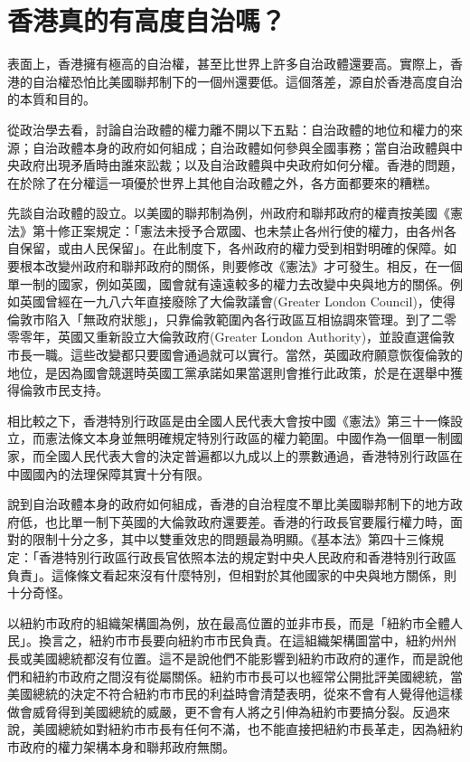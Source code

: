 \section{香港真的有高度自治嗎？}
\label{sec:sec16}

表面上，香港擁有極高的自治權，甚至比世界上許多自治政體還要高。實際上，香港的自治權恐怕比美國聯邦制下的一個州還要低。這個落差，源自於香港高度自治的本質和目的。

從政治學去看，討論自治政體的權力離不開以下五點：自治政體的地位和權力的來源；自治政體本身的政府如何組成；自治政體如何參與全國事務；當自治政體與中央政府出現矛盾時由誰來訟裁；以及自治政體與中央政府如何分權。香港的問題，在於除了在分權這一項優於世界上其他自治政體之外，各方面都要來的糟糕。

先談自治政體的設立。以美國的聯邦制為例，州政府和聯邦政府的權責按美國《憲法》第十修正案規定：「憲法未授予合眾國、也未禁止各州行使的權力，由各州各自保留，或由人民保留」。在此制度下，各州政府的權力受到相對明確的保障。如要根本改變州政府和聯邦政府的關係，則要修改《憲法》才可發生。相反，在一個單一制的國家，例如英國，國會就有遠遠較多的權力去改變中央與地方的關係。例如英國曾經在一九八六年直接廢除了大倫敦議會(Greater London Council)，使得倫敦市陷入「無政府狀態」，只靠倫敦範圍內各行政區互相協調來管理。到了二零零零年，英國又重新設立大倫敦政府(Greater London Authority)，並設直選倫敦市長一職。這些改變都只要國會通過就可以實行。當然，英國政府願意恢復倫敦的地位，是因為國會競選時英國工黨承諾如果當選則會推行此政策，於是在選舉中獲得倫敦市民支持。

相比較之下，香港特別行政區是由全國人民代表大會按中國《憲法》第三十一條設立，而憲法條文本身並無明確規定特別行政區的權力範圍。中國作為一個單一制國家，而全國人民代表大會的決定普遍都以九成以上的票數通過，香港特別行政區在中國國內的法理保障其實十分有限。

說到自治政體本身的政府如何組成，香港的自治程度不單比美國聯邦制下的地方政府低，也比單一制下英國的大倫敦政府還要差。香港的行政長官要履行權力時，面對的限制十分之多，其中以雙重效忠的問題最為明顯。《基本法》第四十三條規定：「香港特別行政區行政長官依照本法的規定對中央人民政府和香港特別行政區負責」。這條條文看起來沒有什麼特別，但相對於其他國家的中央與地方關係，則十分奇怪。

以紐約市政府的組織架構圖為例，放在最高位置的並非市長，而是「紐約市全體人民」。換言之，紐約市市長要向紐約市市民負責。在這組織架構圖當中，紐約州州長或美國總統都沒有位置。這不是說他們不能影響到紐約市政府的運作，而是說他們和紐約市政府之間沒有從屬關係。紐約市市長可以也經常公開批評美國總統，當美國總統的決定不符合紐約市市民的利益時會清楚表明，從來不會有人覺得他這樣做會威脅得到美國總統的威嚴，更不會有人將之引伸為紐約市要搞分裂。反過來說，美國總統如對紐約市市長有任何不滿，也不能直接把紐約市長革走，因為紐約市政府的權力架構本身和聯邦政府無關。

